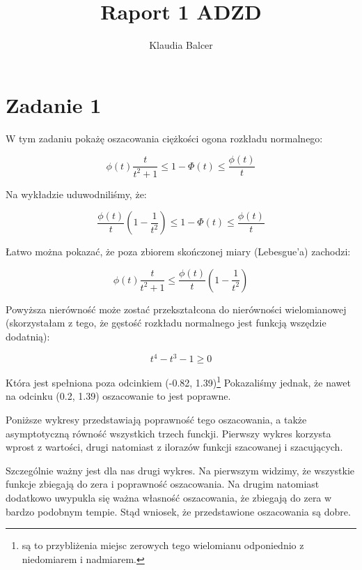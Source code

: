 \documentclass[a4paper,11pt]{article}
\author{Klaudia Balcer}
\title{Raport 1 ADZD}
\begin{document}
\maketitle
\tableofcontents
\pagebreak

\section{Zadanie 1}

W tym zadaniu pokażę oszacowania ciężkości ogona rozkładu normalnego:

$$ \phi(t) \frac{t}{t^{2}+1} \leq 1  - \Phi(t) \leq \frac{\phi(t)}{t} $$

Na wykładzie uduwodniliśmy, że:

$$ \frac{\phi(t)}{t}(1-\frac{1}{t^{2}}) \leq 1  - \Phi(t) \leq \frac{\phi(t)}{t} $$

Łatwo można pokazać, że poza zbiorem skończonej miary (Lebesgue'a) zachodzi:

$$ \phi(t) \frac{t}{t^{2}+1} \leq \frac{\phi(t)}{t}(1-\frac{1}{t^{2}})$$

Powyższa nierówność może zostać przekształcona do nierówności wielomianowej (skorzystałam z tego, że gęstość rozkładu normalnego jest funkcją wszędzie dodatnią):

$$t^{4} - t^{3} -1 \geq  0 $$ 

Która jest spełniona poza odcinkiem (-0.82, 1.39)\footnote{są to przybliżenia miejsc zerowych tego wielomianu odponiednio z niedomiarem i nadmiarem.} Pokazaliśmy jednak, że nawet na odcinku (0.2, 1.39) oszacowanie to jest poprawne.

Poniższe wykresy przedstawiają poprawność tego oszacowania, a także asymptotyczną równość wszystkich trzech funckji. Pierwszy wykres korzysta wprost z wartości,  drugi natomiast z ilorazów funkcji szacowanej i szacujących. 

Szczególnie ważny jest dla nas drugi wykres. Na pierwszym widzimy, że wszystkie funkcje zbiegają do zera i poprawność oszacowania. Na drugim natomiast dodatkowo uwypukla się ważna własność oszacowania, że zbiegają do zera w bardzo podobnym tempie.  Stąd wniosek, że przedstawione oszacowania są dobre. 
\end{document}
